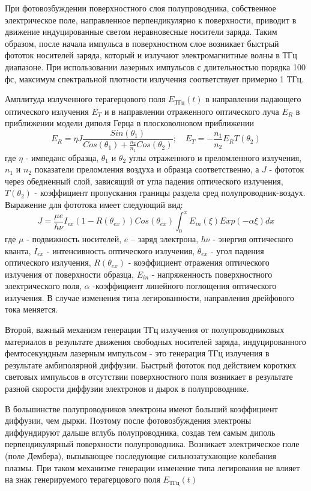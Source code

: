 \documentclass[a4paper,14pt,russian]{extreport}
\begin{document}
				При фотовозбуждении поверхностного слоя полупроводника, собственное электрическое поле, направленное перпендикулярно к поверхности, приводит в движение индуцированные светом неравновесные носители заряда. Таким образом, после начала импульса в поверхностном слое возникает быстрый фототок носителей заряда, который и излучают электромагнитные волны в ТГц диапазоне. При использовании лазерных импульсов с длительностью порядка 100 фс, максимум спектральной плотности излучения соответствует примерно 1 ТГц.\par
				Амплитуда излученного терагерцового поля $E_{\text{ТГц}}(t)$ в направлении падающего оптического излучения $E_T$ и в направлении отраженного оптического луча $E_R$ в приближении модели диполя Герца в плосковолновом приближении
				\begin{equation}\label{THzAmplitude}
					E_R = \eta J \frac{Sin(\theta_1)}{Cos(\theta_1)+\frac{n_2}{n_1}Cos(\theta_2)}; \quad
					E_T = -\frac{n_1}{n_2}E_R T(\theta_2)
				\end{equation}
				где $\eta$ - импеданс образца, $\theta_1$ и $\theta_2$ углы отраженного и преломленного излучения, $n_1$ и $n_2$ показатели преломления воздуха и образца соответственно, а $J$ - фототок через обедненный слой, зависящий от угла падения оптического излучения, $T(\theta_2)$ - коэффициент пропускания границы раздела сред полупроводник-воздух. Выражение для фототока имеет следующий вид:
				\begin{equation}\label{CurrentDencity}
					J = \frac{\mu e}{h \nu} I_{ex}(1-R(\theta_{ex}))Cos(\theta_{ex})\int_0^{x}E_{in}(\xi)Exp(-\alpha \xi)dx
				\end{equation}
				где $\mu$ - подвижность носителей, $e$ – заряд электрона, $h \nu$ - энергия оптического
кванта, $I_{ex}$ - интенсивность оптического излучения, $\theta_{ex}$ - угол падения оптического излучения, $R(\theta_{ex})$ - коэффициент отражения оптического излучения от поверхности образца, $E_{in}$ - напряженность поверхностного электрического поля, $\alpha$ -коэффициент линейного поглощения оптического излучения. В случае изменения типа легированности, направления дрейфового тока меняется.\par
				Второй, важный механизм генерации ТГц излучения от полупроводниковых материалов в результате движения свободных носителей заряда, индуцированного фемтосекундным лазерным импульсом - это генерация ТГц излучения в результате амбиполярной диффузии. Быстрый фототок под действием коротких световых импульсов в отсутствии поверхностного поля возникает в результате разной скорости диффузии электронов и дырок в полупроводнике.\par
				В большинстве полупроводников электроны имеют больший коэффициент диффузии, чем дырки. Поэтому после	фотовозбуждения электроны диффундируют дальше вглубь полупроводника, создав тем самым диполь перпендикулярный поверхности полупроводника. Возникает электрическое поле (поле Дембера), вызывающее последующие сильнозатухающие колебания плазмы. При таком механизме генерации изменение типа легирования не влияет на знак генерируемого терагерцового поля $E_{\text{ТГц}}(t)$
\end{document}
